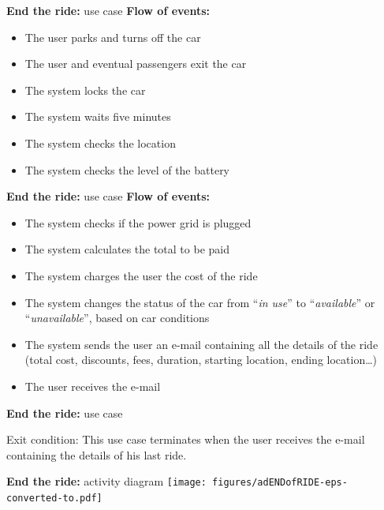 \documentclass{beamer}
\begin{document}
	\begin{frame} {\textbf{End the ride:} use case}
		\textbf{Flow of events:}\\
		\begin{itemize} 
			\item The user parks and turns off the car
			\item The user and eventual passengers exit the car
			\item The system locks the car
			\item The system waits five minutes
			\item The system checks the location
			\item The system checks the level of the battery
		\end{itemize}
	\end{frame}

	\begin{frame} {\textbf{End the ride:} use case}
		\textbf{Flow of events:}\\
		\begin{itemize} 
			\item The system checks if the power grid is plugged
			\item The system calculates the total to be paid
			\item The system charges the user the cost of the ride
			\item The system changes the status of the car from ``\textit{in use}'' to ``\textit{available}'' or ``\textit{unavailable}'', based on  car conditions
			\item The system sends the user an e-mail containing all the details of the ride (total cost, discounts, fees, duration, starting location, ending location\ldots)
			\item The user receives the e-mail
		\end{itemize}
	\end{frame}
	
	\begin{frame}{\textbf{End the ride:} use case}
		\begin{block}{Exit condition:}
			This use case terminates when the user receives the e-mail containing the details of his last ride.
		\end{block}
	\end{frame}

	\begin{frame}{\textbf{End the ride:} activity diagram}
		\texttt{[image: figures/adENDofRIDE-eps-converted-to.pdf]}
	\end{frame}
\end{document}

